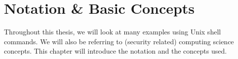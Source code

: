 \chapter{Notation \& Basic Concepts}\label{chapter:notation}
Throughout this thesis, we will look at many examples using Unix shell commands. We will also be referring to (security related) computing science concepts. This chapter will introduce the notation and the concepts used.





